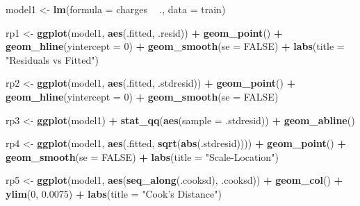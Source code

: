 \documentclass[]{article}
\newenvironment{Shaded}{\begin{snugshade}}{\end{snugshade}}
\newcommand{\KeywordTok}[1]{\textcolor[rgb]{0.13,0.29,0.53}{\textbf{#1}}}
\newcommand{\DataTypeTok}[1]{\textcolor[rgb]{0.13,0.29,0.53}{#1}}
\newcommand{\DecValTok}[1]{\textcolor[rgb]{0.00,0.00,0.81}{#1}}
\newcommand{\FloatTok}[1]{\textcolor[rgb]{0.00,0.00,0.81}{#1}}
\newcommand{\StringTok}[1]{\textcolor[rgb]{0.31,0.60,0.02}{#1}}
\newcommand{\OtherTok}[1]{\textcolor[rgb]{0.56,0.35,0.01}{#1}}
\newcommand{\OperatorTok}[1]{\textcolor[rgb]{0.81,0.36,0.00}{\textbf{#1}}}
\newcommand{\NormalTok}[1]{#1}
\begin{document}
\begin{Shaded}
\begin{Highlighting}[]
\NormalTok{model1 <-}\StringTok{ }\KeywordTok{lm}\NormalTok{(}\DataTypeTok{formula =}\NormalTok{ charges }\OperatorTok{~}\StringTok{ }\NormalTok{.,}
             \DataTypeTok{data =}\NormalTok{ train)}

\NormalTok{rp1 <-}\StringTok{ }\KeywordTok{ggplot}\NormalTok{(model1, }\KeywordTok{aes}\NormalTok{(.fitted, .resid)) }\OperatorTok{+}
\StringTok{  }\KeywordTok{geom_point}\NormalTok{() }\OperatorTok{+}
\StringTok{  }\KeywordTok{geom_hline}\NormalTok{(}\DataTypeTok{yintercept =} \DecValTok{0}\NormalTok{) }\OperatorTok{+}
\StringTok{  }\KeywordTok{geom_smooth}\NormalTok{(}\DataTypeTok{se =} \OtherTok{FALSE}\NormalTok{) }\OperatorTok{+}
\StringTok{  }\KeywordTok{labs}\NormalTok{(}\DataTypeTok{title =} \StringTok{"Residuals vs Fitted"}\NormalTok{)}

\NormalTok{rp2 <-}\StringTok{ }\KeywordTok{ggplot}\NormalTok{(model1, }\KeywordTok{aes}\NormalTok{(.fitted, .stdresid)) }\OperatorTok{+}
\StringTok{  }\KeywordTok{geom_point}\NormalTok{() }\OperatorTok{+}
\StringTok{  }\KeywordTok{geom_hline}\NormalTok{(}\DataTypeTok{yintercept =} \DecValTok{0}\NormalTok{) }\OperatorTok{+}
\StringTok{  }\KeywordTok{geom_smooth}\NormalTok{(}\DataTypeTok{se =} \OtherTok{FALSE}\NormalTok{)}

\NormalTok{rp3 <-}\StringTok{ }\KeywordTok{ggplot}\NormalTok{(model1) }\OperatorTok{+}
\StringTok{  }\KeywordTok{stat_qq}\NormalTok{(}\KeywordTok{aes}\NormalTok{(}\DataTypeTok{sample =}\NormalTok{ .stdresid)) }\OperatorTok{+}
\StringTok{  }\KeywordTok{geom_abline}\NormalTok{()}

\NormalTok{rp4 <-}\StringTok{ }\KeywordTok{ggplot}\NormalTok{(model1, }\KeywordTok{aes}\NormalTok{(.fitted, }\KeywordTok{sqrt}\NormalTok{(}\KeywordTok{abs}\NormalTok{(.stdresid)))) }\OperatorTok{+}
\StringTok{  }\KeywordTok{geom_point}\NormalTok{() }\OperatorTok{+}
\StringTok{  }\KeywordTok{geom_smooth}\NormalTok{(}\DataTypeTok{se =} \OtherTok{FALSE}\NormalTok{) }\OperatorTok{+}
\StringTok{  }\KeywordTok{labs}\NormalTok{(}\DataTypeTok{title =} \StringTok{"Scale-Location"}\NormalTok{)}

\NormalTok{rp5 <-}\StringTok{ }\KeywordTok{ggplot}\NormalTok{(model1, }\KeywordTok{aes}\NormalTok{(}\KeywordTok{seq_along}\NormalTok{(.cooksd), .cooksd)) }\OperatorTok{+}
\StringTok{  }\KeywordTok{geom_col}\NormalTok{() }\OperatorTok{+}
\StringTok{  }\KeywordTok{ylim}\NormalTok{(}\DecValTok{0}\NormalTok{, }\FloatTok{0.0075}\NormalTok{) }\OperatorTok{+}
\StringTok{  }\KeywordTok{labs}\NormalTok{(}\DataTypeTok{title =} \StringTok{"Cook's Distance"}\NormalTok{)}


\end{Highlighting}
\end{Shaded}
\end{document}
